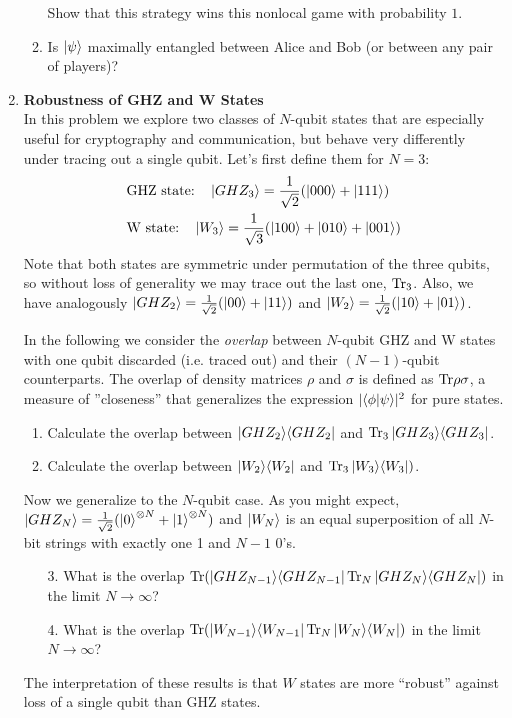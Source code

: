 \documentclass[12pt]{article}
\begin{document}
\begin{enumerate}
\begin{enumerate}
Show that this strategy wins this nonlocal game with probability $1$.
\item Is $\ket{\psi}$ maximally entangled between Alice and Bob (or between any pair of players)? 
\end{enumerate}



\item {\bf Robustness of GHZ and W States}\label{ex:robust-GHZ}\\
In this problem we explore two classes of $N$-qubit states that are especially useful for cryptography and communication, but behave very differently under tracing out a single qubit. Let's first define them for $N=3$:
\begin{align*}
& \text{GHZ state:} \quad \ket{GHZ_3} = \frac{1}{\sqrt{2}} (\ket{000}+\ket{111}) \\
& \text{W state:} \quad \ket{W_3} = \frac{1}{\sqrt{3}} (\ket{100}+\ket{010}+\ket{001})
\end{align*}
Note that both states are symmetric under permutation of the three qubits, so without loss of generality we may trace out the last one, $\mathrm{Tr}_3$. Also, we have analogously $\ket{GHZ_2}=\frac{1}{\sqrt{2}} (\ket{00}+\ket{11})$ and $\ket{W_2}=\frac{1}{\sqrt{2}} (\ket{10}+\ket{01})$.

In the following we consider the \textit{overlap} between $N$-qubit GHZ and W states with one qubit discarded (i.e. traced out) and their $(N-1)$-qubit counterparts. The overlap of density matrices $\rho$ and $\sigma$ is defined as $\mathrm{Tr} \rho\sigma$, a measure of ''closeness'' that generalizes the expression $|\langle \phi \vert \psi\rangle|^2$ for pure states.
\begin{enumerate}
\item Calculate the overlap between $\ket{GHZ_2}\!\bra{GHZ_2}$ and $\mathrm{Tr}_3\ket{GHZ_3}\!\bra{GHZ_3}$.
\item Calculate the overlap between  $\ket{W_2}\!\bra{W_2}$ and $\mathrm{Tr}_3\ket{W_3}\!\bra{W_3})$.
\end{enumerate}
Now we generalize to the $N$-qubit case. As you might expect, $\ket{GHZ_N}=\frac{1}{\sqrt{2}} (\ket{0}^{\otimes N}+\ket{1}^{\otimes N})$ and $\ket{W_N}$ is an equal superposition of all $N$-bit strings with exactly one 1 and $N-1$ 0's.
\begin{enumerate}
\item[3.] What is the overlap $\mathrm{Tr}(\ket{GHZ_{N-1}}\!\bra{GHZ_{N-1}} \mathrm{Tr}_N\ket{GHZ_N}\!\bra{GHZ_N})$ in the limit $N \rightarrow \infty$?
\item[4.] What is the overlap $\mathrm{Tr}(\ket{W_{N-1}}\!\bra{W_{N-1}} \mathrm{Tr}_N\ket{W_N}\!\bra{W_N})$ in the limit $N \rightarrow \infty$?
\end{enumerate}
The interpretation of these results is that $W$ states are more ``robust'' against loss of a single qubit than GHZ states.



\end{enumerate}
\end{document}
